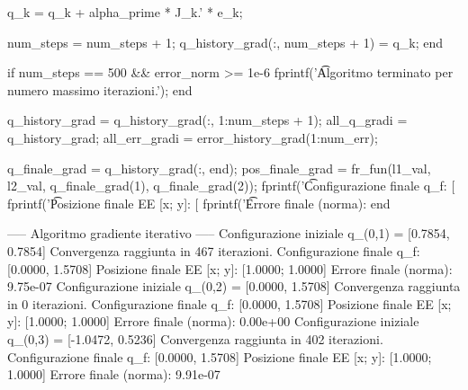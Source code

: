 \documentclass[11pt, a4paper]{article}
\begin{document}
\newpage
\begin{matlabcode}

        q_k = q_k + alpha_prime * J_k.' * e_k;

        num_steps = num_steps + 1;
        q_history_grad(:, num_steps + 1) = q_k;
    end

    if num_steps == 500 && error_norm >= 1e-6
        fprintf('\t Algoritmo terminato per numero massimo iterazioni.\n');
    end

    q_history_grad = q_history_grad(:, 1:num_steps + 1);
    all_q_grad{i} = q_history_grad;
    all_err_grad{i} = error_history_grad(1:num_err);

    q_finale_grad = q_history_grad(:, end);
    pos_finale_grad = fr_fun(l1_val, l2_val, q_finale_grad(1), q_finale_grad(2));
    fprintf('\t Configurazione finale q_f: [%
    fprintf('\t Posizione finale EE [x; y]: [%
    fprintf('\t Errore finale (norma): %
end
\end{matlabcode}
\begin{matlaboutput}
----- Algoritmo gradiente iterativo -----
Configurazione iniziale q_(0,1) = [0.7854, 0.7854]
	 Convergenza raggiunta in 467 iterazioni.
	 Configurazione finale q_f: [0.0000, 1.5708]
	 Posizione finale EE [x; y]: [1.0000; 1.0000]
	 Errore finale (norma): 9.75e-07
Configurazione iniziale q_(0,2) = [0.0000, 1.5708]
	 Convergenza raggiunta in 0 iterazioni.
	 Configurazione finale q_f: [0.0000, 1.5708]
	 Posizione finale EE [x; y]: [1.0000; 1.0000]
	 Errore finale (norma): 0.00e+00
Configurazione iniziale q_(0,3) = [-1.0472, 0.5236]
	 Convergenza raggiunta in 402 iterazioni.
	 Configurazione finale q_f: [0.0000, 1.5708]
	 Posizione finale EE [x; y]: [1.0000; 1.0000]
	 Errore finale (norma): 9.91e-07
\end{matlaboutput}
\end{document}
